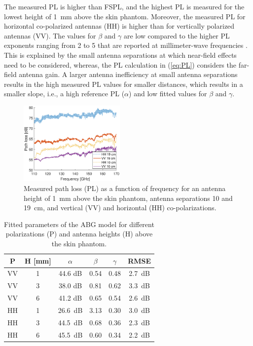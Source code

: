 \documentclass[preprint]{rsl}
\begin{document}
The measured PL is higher than FSPL, and the highest PL is measured for the lowest height of 1~mm above the skin phantom.
Moreover, the measured PL for horizontal co-polarized antennas (HH) is higher than for vertically polarized antennas (VV).
The values for $\beta$ and $\gamma$ are low compared to the higher PL exponents ranging from 2 to 5 that are reported at millimeter-wave frequencies \cite{Petrillo2014, Aminzadeh2021_tap}. 
This is explained by the small antenna separations at which near-field effects need to be considered, whereas, the PL calculation in (\ref{eq:PL}) considers the far-field antenna gain.
A larger antenna inefficiency at small antenna separations results in the high measured PL values for smaller distances, which results in a smaller slope, i.e., a high reference PL ($\alpha$) and low fitted values for $\beta$ and $\gamma$.

\begin{figure}[t]
\begin{center}
  \includegraphics[width=0.46\textwidth]{figures/PL_vs_freq}
\caption{Measured path loss (PL) as a function of frequency for an antenna height of 1~mm above the skin phantom, antenna separations 10 and 19~cm, and vertical (VV) and horizontal (HH) co-polarizations.}
\label{fig:PL_vs_freq}
\end{center}
\end{figure}
\begin{table}[t]
  \caption{Fitted parameters of the ABG model for different polarizations (P) and antenna heights (H) above the skin phantom.}
  \label{table:ABG}
  \begin{center}
    \begin{tabular}{cc|cccc}
      P & H [mm] & $\alpha$ & $\beta$ & $\gamma$ & RMSE \\
      \hline
      VV & 1 & 44.6 dB & 0.54 & 0.48 & 2.7~dB \\
      VV & 3 & 38.0 dB & 0.81 & 0.62 & 3.3~dB \\
      VV & 6 & 41.2 dB & 0.65 & 0.54 & 2.6~dB \\
      HH & 1 & 26.6~dB & 3.13 & 0.30 & 3.0~dB \\
      HH & 3 & 44.5~dB & 0.68 & 0.36 & 2.3~dB \\
      HH & 6 & 45.5~dB & 0.60 & 0.34 & 2.2~dB \\
    \end{tabular}
  \end{center}
\end{table}
\end{document}

